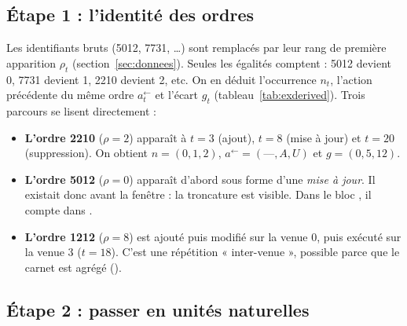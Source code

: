 \subsection{Étape 1 : l'identité des ordres}
Les identifiants bruts (5012, 7731, \dots) sont remplacés par leur rang de première apparition $\rho_t$ (section~\ref{sec:donnees}). Seules les égalités comptent : 5012 devient 0, 7731 devient 1, 2210 devient 2, etc. On en déduit l'occurrence $n_t$, l'action précédente du même ordre $a^{\leftarrow}_t$ et l'écart $g_t$ (tableau~\ref{tab:exderived}). Trois parcours se lisent directement :

\begin{itemize}
\item \textbf{L'ordre 2210} ($\rho=2$) apparaît à $t=3$ (ajout), $t=8$ (mise à jour) et $t=20$ (suppression). On obtient $n=(0,1,2)$, $a^{\leftarrow}=(\text{—},A,U)$ et $g=(0,5,12)$.
\item \textbf{L'ordre 5012} ($\rho=0$) apparaît d'abord sous forme d'une \emph{mise à jour}. Il existait donc avant la fenêtre : la troncature est visible. Dans le bloc , il compte dans .
\item \textbf{L'ordre 1212} ($\rho=8$) est ajouté puis modifié sur la venue 0, puis exécuté sur la venue 3 ($t=18$). C'est une répétition « inter-venue », possible parce que le carnet est agrégé ().
\end{itemize}

\subsection{Étape 2 : passer en unités naturelles}
\begin{table}[H]\centering\scriptsize

\caption{Grandeurs dérivées, calculées par  : spread $S_t$ en ticks, variation du mid $h_t$ en demi-ticks, distance au meilleur prix de son côté $D_t$ en ticks, flux $F_t$ en lots.}
\label{tab:exderived}
\end{table}

